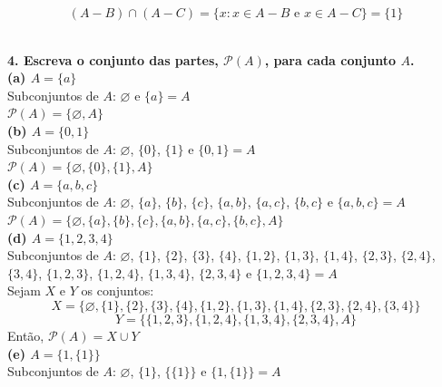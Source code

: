 \documentclass[12pt, a4paper]{article}
\begin{document}
\[(A-B) \cap (A - C) = \{x: x \in A-B \text{ e } x \in A - C\} = \{1\}\] \\
\newpage

\textbf{4. Escreva o conjunto das partes, \(\mathscr{P}(A)\), para cada conjunto \(A\).} \\

\textbf{(a) \(A= \{a\}\)} \\

Subconjuntos de \(A\): \(\varnothing\) e \(\{a\} = A\) \\

\(\mathscr{P}(A) = \{\varnothing, A\}\) \\

\textbf{(b) \(A= \{0,1\}\)} \\

Subconjuntos de \(A\): \(\varnothing\), \(\{0\}\), \(\{1\}\) e \(\{0,1\} = A\) \\

\(\mathscr{P}(A) = \{\varnothing, \{0\}, \{1\}, A\}\) \\


\textbf{(c) \(A= \{a,b,c\}\)} \\

Subconjuntos de \(A\): \(\varnothing\), \(\{a\}\), \(\{b\}\), \(\{c\}\), \(\{a,b\}\), \(\{a,c\}\), \(\{b,c\}\) e  \(\{a,b,c\} = A\) \\

\(\mathscr{P}(A) = \{\varnothing, \{a\}, \{b\}, \{c\}, \{a,b\}, \{a,c\}, \{b,c\}, A\}\) \\


\textbf{(d) \(A= \{1,2,3,4\}\)} \\

Subconjuntos de \(A\): \(\varnothing\), \(\{1\}\), \(\{2\}\), \(\{3\}\), \(\{4\}\), \(\{1,2\}\), \(\{1,3\}\), \(\{1,4\}\), \(\{2,3\}\), \(\{2,4\}\), \(\{3,4\}\), \(\{1,2,3\}\), \(\{1,2,4\}\), \(\{1,3,4\}\), \(\{2,3,4\}\) e  \(\{1,2,3,4\} = A\) \\

Sejam \(X\) e \(Y\) os conjuntos: \[X = \{\varnothing, \{1\}, \{2\}, \{3\}, \{4\}, \{1,2\}, \{1,3\}, \{1,4\}, \{2,3\}, \{2,4\}, \{3,4\}\}\] \[Y = \{  \{1,2,3\}, \{1,2,4\}, \{1,3,4\}, \{2,3,4\},  A\}\]
Então, 
\(\mathscr{P}(A) = X \cup Y\) \\

\textbf{(e) \(A= \{1,\{1\}\}\)} \\

Subconjuntos de \(A\): \(\varnothing\), \(\{1\}\), \(\{\{1\}\}\) e \(\{1,\{1\}\} = A\) \\
\end{document}
